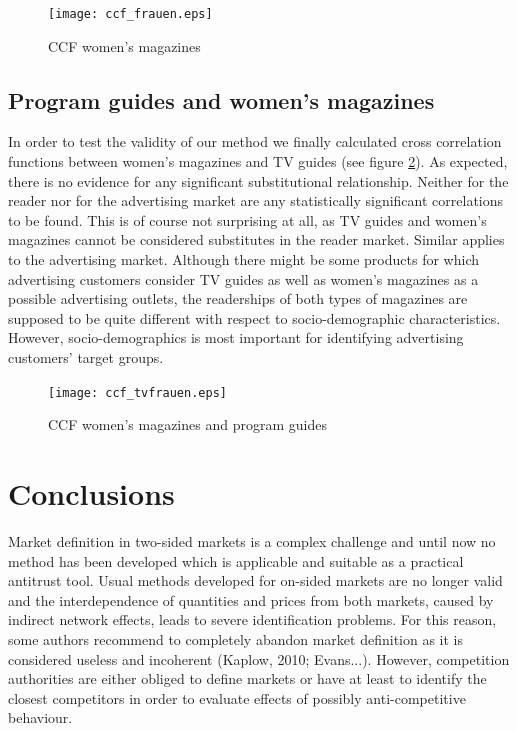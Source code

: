 \documentclass[12pt,a4paper,notitlepage]{article}
\begin{document}
\begin{figure}[H]
\caption{CCF women's magazines}
\label{fig_ccf_frauen}
	\centering
	\texttt{[image: ccf\_frauen.eps]}
\end{figure}


\subsection{Program guides and women's magazines }

In order to test the validity of our method we finally calculated cross correlation functions between women's magazines and TV guides (see figure \ref{ccf_tvfrauen}). As expected, there is no evidence for any significant substitutional relationship. Neither for the reader nor for the advertising market are any statistically significant correlations to be found. This is of course not surprising at all, as TV guides and women's magazines cannot be considered substitutes in the reader market. Similar applies to the advertising market. Although there might be some products for which advertising customers consider TV guides as well as women's magazines as a possible advertising outlets, the readerships of both types of magazines are supposed to be quite different with respect to socio-demographic characteristics. However, socio-demographics is most important for identifying advertising customers' target groups. 

\begin{figure}[H]
\caption{CCF women's magazines and program guides}
\label{ccf_tvfrauen}
	\centering
	\texttt{[image: ccf\_tvfrauen.eps]}
\end{figure}




\section{Conclusions}

Market definition in two-sided markets is a complex challenge and until now no method has been developed which is applicable and suitable as a practical  antitrust tool. Usual methods developed for on-sided markets are no longer valid and the interdependence of quantities and prices from both markets, caused by indirect network effects, leads to severe identification problems. For this reason, some authors recommend to completely abandon market definition as it is considered useless and incoherent (Kaplow, 2010; Evans...). However, competition authorities are either obliged to define markets or have at least to identify the closest competitors in order to evaluate effects of possibly anti-competitive behaviour.   
\end{document}
